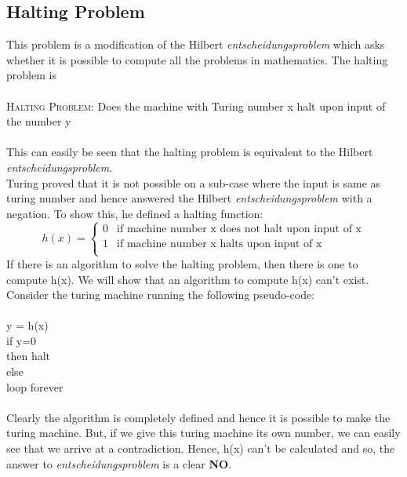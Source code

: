 \subsection{Halting Problem}
This problem is a modification of the Hilbert {\it entscheidungsproblem} which asks whether it is possible to compute all the problems in mathematics. The halting problem is\\\\{\scshape Halting Problem: } Does the machine with Turing number x halt upon input of the number y\\
\\This can easily be seen that the halting problem is equivalent to the Hilbert {\it entscheidungsproblem}.\\
Turing proved that it is not possible on a sub-case where the input is same as turing number and hence answered the Hilbert {\it entscheidungsproblem} with a negation. To show this, he defined a halting function:\\
	\begin{equation}
	h(x) = 
	\begin{cases}
	0 & \text{if machine number x does not halt upon input of x}\\
	1 & \text{if machine number x halts upon input of x}\\
	\end{cases}
	\end{equation}	
If there is an algorithm to solve the halting problem, then there is one to compute h(x). We will show that an algorithm to compute h(x) can't exist. Consider the turing machine running the following pseudo-code:\\\\
\indent \indent \large y = h(x) \\
\indent \indent \large if y=0\\
\indent \indent \indent \indent then halt \\
\indent \indent \large else\\
\indent \indent \indent \indent loop forever \\
\normalsize
\\Clearly the algorithm is completely defined and hence it is possible to make the turing machine. But, if we give this turing machine its own number, we can easily see that we arrive at a contradiction. Hence, h(x) can't be calculated and so, the answer to {\it entscheidungsproblem} is a clear {\bf NO}.

\newpage


